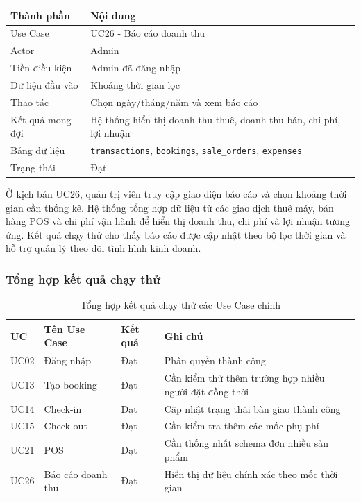 \begin{table}[H]
	\centering
	\begin{tabularx}{\textwidth}{|l|X|}
		\hline
		\textbf{Thành phần} & \textbf{Nội dung} \\
		\hline
		Use Case & UC26 - Báo cáo doanh thu \\
		\hline
		Actor & Admin \\
		\hline
		Tiền điều kiện & Admin đã đăng nhập \\
		\hline
		Dữ liệu đầu vào & Khoảng thời gian lọc \\
		\hline
		Thao tác & Chọn ngày/tháng/năm và xem báo cáo \\
		\hline
		Kết quả mong đợi & Hệ thống hiển thị doanh thu thuê, doanh thu bán, chi phí, lợi nhuận \\
		\hline
		Bảng dữ liệu & \texttt{transactions}, \texttt{bookings}, \texttt{sale\_orders}, \texttt{expenses} \\
		\hline
		Trạng thái & Đạt \\
		\hline
	\end{tabularx}
\end{table}

Ở kịch bản UC26, quản trị viên truy cập giao diện báo cáo và chọn khoảng thời gian cần thống kê. Hệ thống tổng hợp dữ liệu từ các giao dịch thuê máy, bán hàng POS và chi phí vận hành để hiển thị doanh thu, chi phí và lợi nhuận tương ứng. Kết quả chạy thử cho thấy báo cáo được cập nhật theo bộ lọc thời gian và hỗ trợ quản lý theo dõi tình hình kinh doanh.

\subsubsection{Tổng hợp kết quả chạy thử}

\begin{table}[H]
	\centering
	\caption{Tổng hợp kết quả chạy thử các Use Case chính}
	\begin{tabularx}{\textwidth}{|l|l|X|l|}
		\hline
		\textbf{UC} & \textbf{Tên Use Case} & \textbf{Kết quả} & \textbf{Ghi chú} \\
		\hline
		UC02 & Đăng nhập & Đạt & Phân quyền thành công \\
		\hline
		UC13 & Tạo booking & Đạt & Cần kiểm thử thêm trường hợp nhiều người đặt đồng thời \\
		\hline
		UC14 & Check-in & Đạt & Cập nhật trạng thái bàn giao thành công \\
		\hline
		UC15 & Check-out & Đạt & Cần kiểm tra thêm các mốc phụ phí \\
		\hline
		UC21 & POS & Đạt & Cần thống nhất schema đơn nhiều sản phẩm \\
		\hline
		UC26 & Báo cáo doanh thu & Đạt & Hiển thị dữ liệu chính xác theo mốc thời gian \\
		\hline
	\end{tabularx}
\end{table}


